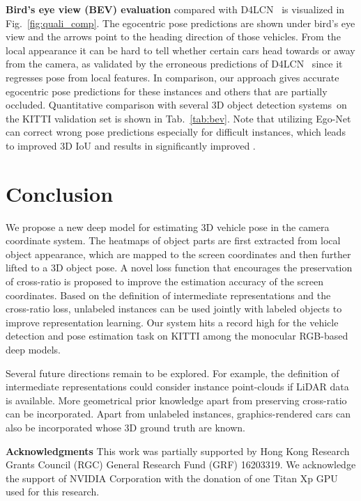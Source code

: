 \documentclass[final]{cvpr}
\begin{document}
\noindent \textbf{Bird's eye view (BEV) evaluation} compared with D4LCN~\cite{Ding_2020_CVPR} is visualized in Fig.~\ref{fig:quali_comp}. The egocentric pose predictions are shown under bird's eye view and the arrows point to the heading direction of those vehicles. From the local appearance it can be hard to tell whether certain cars head towards or away from the camera, as validated by the erroneous predictions of D4LCN~\cite{Ding_2020_CVPR} since it regresses pose from local features. In comparison, our approach gives accurate egocentric pose predictions for these instances and others that are partially occluded. Quantitative comparison with several 3D object detection systems~on the KITTI validation set is shown in Tab.~\ref{tab:bev}. Note that utilizing Ego-Net can correct wrong pose predictions especially for difficult instances, which leads to improved 3D IoU and results in significantly improved .
	
\section{Conclusion} 
We propose a new deep model for estimating 3D vehicle pose in the camera coordinate system. The heatmaps of object parts are first extracted from local object appearance, which are mapped to the screen coordinates and then further lifted to a 3D object pose. A novel loss function that encourages the preservation of cross-ratio is proposed to improve the estimation accuracy of the screen coordinates. Based on the definition of intermediate representations and the cross-ratio loss, unlabeled instances can be used jointly with labeled objects to improve representation learning. Our system hits a record high for the vehicle detection and pose estimation task on KITTI among the monocular RGB-based deep models. 

Several future directions remain to be explored. For example, the definition of intermediate representations could consider instance point-clouds if LiDAR data is available. More geometrical prior knowledge apart from preserving cross-ratio can be incorporated. Apart from unlabeled instances, graphics-rendered cars can also be incorporated whose 3D ground truth are known.

\noindent \textbf{Acknowledgments} This work was partially supported by Hong Kong Research Grants Council (RGC) General Research Fund (GRF) 16203319. We acknowledge the support
of NVIDIA Corporation with the donation of one Titan Xp GPU used for this research.

{\small
	
	
}

\setcounter{section}{0}
\clearpage
\end{document}
